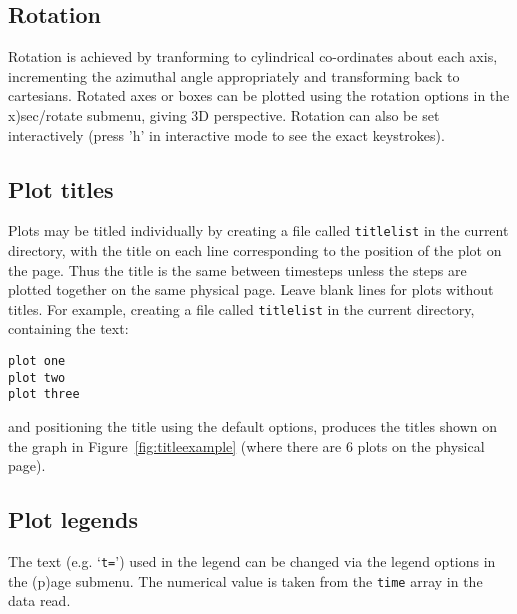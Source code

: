 \documentclass[a4paper,12pt]{article}
\begin{document}
\subsection{Rotation}
 Rotation is achieved by tranforming to cylindrical co-ordinates about each axis, incrementing the
azimuthal angle appropriately and transforming back to cartesians. Rotated axes or boxes can be
plotted using the rotation options in the x)sec/rotate submenu, giving 3D perspective. Rotation can also be set
interactively (press 'h' in interactive mode to see the exact keystrokes). 

\subsection{Plot titles}
\label{sec:title}
 Plots may be titled individually by creating a file called \verb+titlelist+ in
the current directory, with the title on each line corresponding to the position
of the plot on the page. Thus the title is the same between timesteps unless the
steps are plotted together on the same physical page. Leave blank lines for
plots without titles. For example, creating a file called \verb+titlelist+ in
the current directory, containing the text:
\begin{verbatim}
plot one
plot two
plot three
\end{verbatim}
and positioning the title using the default options, produces the titles shown
on the graph in Figure~\ref{fig:titleexample} (where there are 6 plots on the physical page).

%

\subsection{Plot legends}
\label{sec:legend}
 The text (e.g. `\verb+t=+') used in the legend can be changed via
the legend options in the (p)age submenu. The numerical value is taken from the \verb+time+ array
in the data read.
\end{document}
